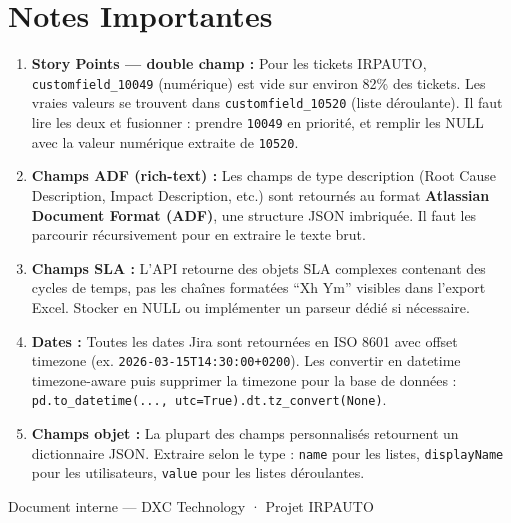\documentclass[12pt, a4paper]{article}
\begin{document}
\section{Notes Importantes}

\begin{enumerate}[leftmargin=2em, itemsep=6pt]

  \item \textbf{Story Points — double champ :}
        Pour les tickets IRPAUTO, \texttt{customfield\_10049} (numérique) est vide
        sur environ 82\% des tickets. Les vraies valeurs se trouvent dans
        \texttt{customfield\_10520} (liste déroulante). Il faut lire les deux et
        fusionner : prendre \texttt{10049} en priorité, et remplir les NULL avec
        la valeur numérique extraite de \texttt{10520}.

  \item \textbf{Champs ADF (rich-text) :}
        Les champs de type description (Root Cause Description, Impact Description,
        etc.) sont retournés au format \textbf{Atlassian Document Format (ADF)},
        une structure JSON imbriquée. Il faut les parcourir récursivement pour
        en extraire le texte brut.

  \item \textbf{Champs SLA :}
        L'API retourne des objets SLA complexes contenant des cycles de temps, pas
        les chaînes formatées ``Xh Ym'' visibles dans l'export Excel. Stocker en
        NULL ou implémenter un parseur dédié si nécessaire.

  \item \textbf{Dates :}
        Toutes les dates Jira sont retournées en ISO 8601 avec offset timezone
        (ex. \texttt{2026-03-15T14:30:00+0200}). Les convertir en datetime
        timezone-aware puis supprimer la timezone pour la base de données :
        \texttt{pd.to\_datetime(..., utc=True).dt.tz\_convert(None)}.

  \item \textbf{Champs objet :}
        La plupart des champs personnalisés retournent un dictionnaire JSON.
        Extraire selon le type : \texttt{name} pour les listes, \texttt{displayName}
        pour les utilisateurs, \texttt{value} pour les listes déroulantes.

\end{enumerate}

\vspace{0.5cm}
\noindent{\color{dxcpurple}\rule{\linewidth}{0.8pt}}
\begin{center}
  \small\color{greytext}
  Document interne — DXC Technology · Projet IRPAUTO
\end{center}
\end{document}
